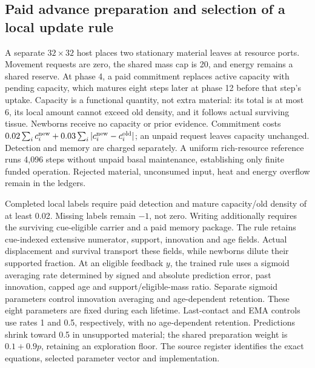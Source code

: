 \subsection*{Paid advance preparation and selection of a local update rule}
A separate $32\times32$ host places two stationary material leaves at resource ports. Movement requests are zero, the shared mass cap is 20, and energy remains a shared reserve. At phase 4, a paid commitment replaces active capacity with pending capacity, which matures eight steps later at phase 12 before that step's uptake. Capacity is a functional quantity, not extra material: its total is at most 6, its local amount cannot exceed old density, and it follows actual surviving tissue. Newborns receive no capacity or prior evidence. Commitment costs $0.02\sum_i c_i^{\rm new}+0.03\sum_i|c_i^{\rm new}-c_i^{\rm old}|$; an unpaid request leaves capacity unchanged. Detection and memory are charged separately. A uniform rich-resource reference runs 4,096 steps without unpaid basal maintenance, establishing only finite funded operation. Rejected material, unconsumed input, heat and energy overflow remain in the ledgers.

Completed local labels require paid detection and mature capacity/old density of at least 0.02. Missing labels remain $-1$, not zero. Writing additionally requires the surviving cue-eligible carrier and a paid memory package. The rule retains cue-indexed extensive numerator, support, innovation and age fields. Actual displacement and survival transport these fields, while newborns dilute their supported fraction. At an eligible feedback $y$, the trained rule uses a sigmoid averaging rate determined by signed and absolute prediction error, past innovation, capped age and support/eligible-mass ratio. Separate sigmoid parameters control innovation averaging and age-dependent retention. These eight parameters are fixed during each lifetime. Last-contact and EMA controls use rates 1 and 0.5, respectively, with no age-dependent retention. Predictions shrink toward 0.5 in unsupported material; the shared preparation weight is $0.1+0.9p$, retaining an exploration floor. The source register identifies the exact equations, selected parameter vector and implementation.

